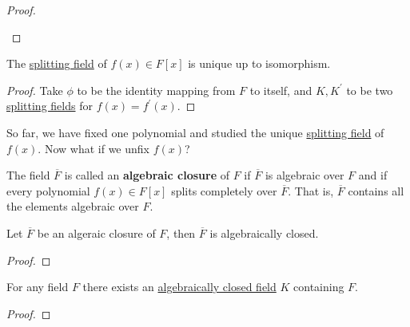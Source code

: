 \begin{proof}
    \begin{figure}[H]
      \centering 
    \end{figure}
  \end{proof}

  \begin{corollary}
    \label{thm:splitting-field-is-unique}
    The \hyperref[def:splitting-field]{splitting field} of $f(x) \in F[x]$ is unique up to isomorphism. 
  \end{corollary}
  \begin{proof}
    Take $\phi$ to be the identity mapping from $F$ to itself, and $K, K^\prime$ to be two \hyperref[def:splitting-field]{splitting fields} for $f(x) = f^\prime (x)$. 
  \end{proof}

  So far, we have fixed one polynomial and studied the unique \hyperref[def:splitting-field]{splitting field} of $f(x)$. Now what if we unfix $f(x)$? 

  \begin{definition}
    \label{def:algebraic-closure}
    The field $\overline{F}$ is called an \textbf{algebraic closure} of $F$ if $\overline{F}$ is algebraic over $F$ and if every polynomial $f(x) \in F[x]$ splits completely over $\overline{F}$. That is, $\overline{F}$ contains all the elements algebraic over $F$. 
  \end{definition}

  \begin{lemma}
    \label{thm:algebraic-closures-are-algebraically-closed}
    Let $\overline{F}$ be an algeraic closure of $F$, then $\overline{F}$ is algebraically closed. 
  \end{lemma}
  \begin{proof}
    
  \end{proof}

  \begin{theorem}
    \label{thm:field-exists-algebraically-closed-field}
    For any field $F$ there exists an \hyperref[def:algebraically-closed-field]{algebraically closed field} $K$ containing $F$.
  \end{theorem}
  \begin{proof}
    
  \end{proof}

